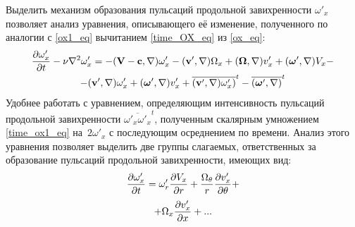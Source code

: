 Выделить механизм образования пульсаций продольной завихренности $\omega'_x$ позволяет анализ уравнения, описывающего её изменение, полученного по аналогии с \eqref{ox1_eq} вычитанием \eqref{time_OX_eq} из \eqref{ox_eq}:
\begin{multline}\label{time_ox1_eq}
\frac{\partial \omega'_x}{\partial t} - \nu \nabla^2 \omega'_x = - (\mathbf{V} - \mathbf{c}, \nabla) \omega'_x - (\mathbf{v}', \nabla) \Omega_x +(\mbox{\boldmath$\Omega$}, \nabla) v'_x + (\mbox{\boldmath$\omega$}', \nabla) V_x - \\ - (\mathbf{v}', \nabla) \omega'_x  + (\mbox{\boldmath$\omega$}', \nabla) v'_x  + \overline{(\mathbf{v}', \nabla) \omega'_x)}^t  - \overline{(\mbox{\boldmath$\omega$}', \nabla)}^t
\end{multline}
Удобнее работать с уравнением, определяющим интенсивность пульсаций продольной завихренности $\overline{\omega'_x \omega'_x}^t$, полученным скалярным умножением \eqref{time_ox1_eq} на~$2 \omega'_x$ с последующим осреднением по времени. Анализ этого уравнения позволяет выделить две группы слагаемых, ответственных за образование пульсаций продольной завихренности, имеющих вид:
\begin{equation}\label{time_ox1gen_terms1}
\frac{\partial \omega'_x}{\partial t} = \omega'_r \frac {\partial V_x}{\partial r} + \frac{\Omega_\theta}{r} \frac{\partial v'_x}{\partial \theta} + 
\end{equation}
\begin{equation}\label{time_ox1gen_term2}
+\Omega_x \frac {\partial v'_x}{\partial x} + ...
\end{equation}
